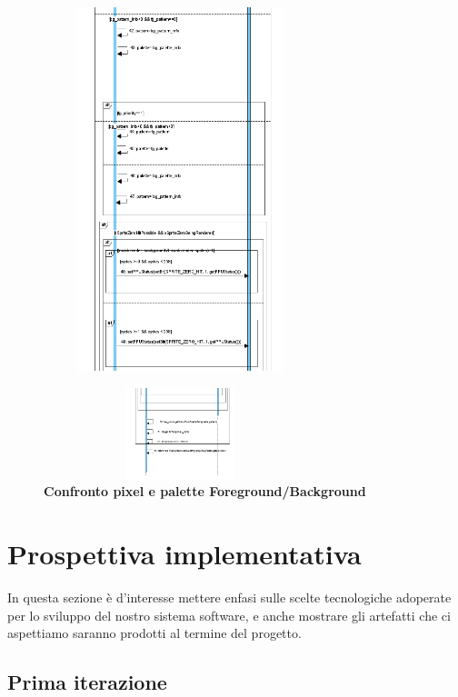 \documentclass[11pt]{article}
\begin{document}
\begin{figure}[h]
\hspace*{-4.2cm}
\centering
\includegraphics[width=300px, height=400px]{Foreground3.png}\\
\end{figure}
\begin{figure}[h]
\hspace*{-4.2cm}
\centering
\includegraphics[width=300px, height=100px]{Foreground4.png}\\
\small\textbf{Confronto pixel e palette Foreground/Background}
\end{figure}

\clearpage
\section{Prospettiva implementativa}
In questa sezione è d'interesse mettere enfasi sulle scelte tecnologiche adoperate per lo sviluppo del nostro sistema software, e anche mostrare gli artefatti che ci aspettiamo saranno prodotti al termine del progetto.
\subsection{Prima iterazione}
\end{document}
